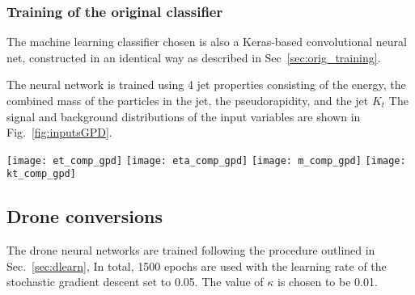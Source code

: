 \subsubsection{Training of the original classifier}

The machine learning classifier chosen is also a Keras-based convolutional neural net,
constructed in an identical way as described in Sec~\ref{sec:orig_training}.

The neural network is trained using 4 jet properties consisting of the energy,
the combined mass of the particles in the jet, the pseudorapidity, and the jet $K_t$ 
The signal and background distributions of the input variables
are shown in Fig.~\ref{fig:inputsGPD}.
%
\begin{figure*}[t]
\centering
\texttt{[image: et\_comp\_gpd]}
\texttt{[image: eta\_comp\_gpd]}
\texttt{[image: m\_comp\_gpd]}
\texttt{[image: kt\_comp\_gpd]}
\caption{\small Comparison of the signal and background distributions
used to train the Keras classifier .}
\label{fig:inputsGPD}
\end{figure*}

\subsection{Drone conversions}

The drone neural networks are trained following the procedure outlined in Sec.~\ref{sec:dlearn},
In total, 1500 epochs are used with
the learning rate of the stochastic gradient descent set to 0.05.
The value of $\kappa$ is chosen to be 0.01.

